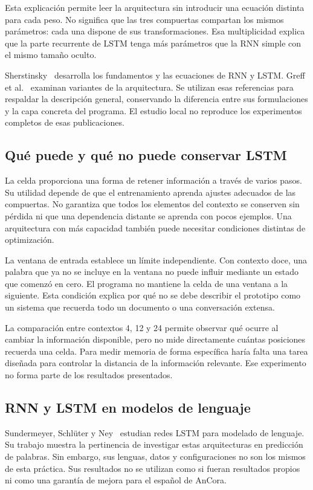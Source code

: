 Esta explicación permite leer la arquitectura sin introducir una ecuación distinta para cada peso. No significa que las tres compuertas compartan los mismos parámetros: cada una dispone de sus transformaciones. Esa multiplicidad explica que la parte recurrente de LSTM tenga más parámetros que la RNN simple con el mismo tamaño oculto.

Sherstinsky~\cite{sherstinsky2020} desarrolla los fundamentos y las ecuaciones de RNN y LSTM. Greff et al.~\cite{greff2017} examinan variantes de la arquitectura. Se utilizan esas referencias para respaldar la descripción general, conservando la diferencia entre sus formulaciones y la capa concreta del programa. El estudio local no reproduce los experimentos completos de esas publicaciones.

\subsection{Qué puede y qué no puede conservar LSTM}
La celda proporciona una forma de retener información a través de varios pasos. Su utilidad depende de que el entrenamiento aprenda ajustes adecuados de las compuertas. No garantiza que todos los elementos del contexto se conserven sin pérdida ni que una dependencia distante se aprenda con pocos ejemplos. Una arquitectura con más capacidad también puede necesitar condiciones distintas de optimización.

La ventana de entrada establece un límite independiente. Con contexto doce, una palabra que ya no se incluye en la ventana no puede influir mediante un estado que comenzó en cero. El programa no mantiene la celda de una ventana a la siguiente. Esta condición explica por qué no se debe describir el prototipo como un sistema que recuerda todo un documento o una conversación extensa.

La comparación entre contextos 4, 12 y 24 permite observar qué ocurre al cambiar la información disponible, pero no mide directamente cuántas posiciones recuerda una celda. Para medir memoria de forma específica haría falta una tarea diseñada para controlar la distancia de la información relevante. Ese experimento no forma parte de los resultados presentados.

\subsection{RNN y LSTM en modelos de lenguaje}
Sundermeyer, Schlüter y Ney~\cite{sundermeyer2012} estudian redes LSTM para modelado de lenguaje. Su trabajo muestra la pertinencia de investigar estas arquitecturas en predicción de palabras. Sin embargo, sus lenguas, datos y configuraciones no son los mismos de esta práctica. Sus resultados no se utilizan como si fueran resultados propios ni como una garantía de mejora para el español de AnCora.

